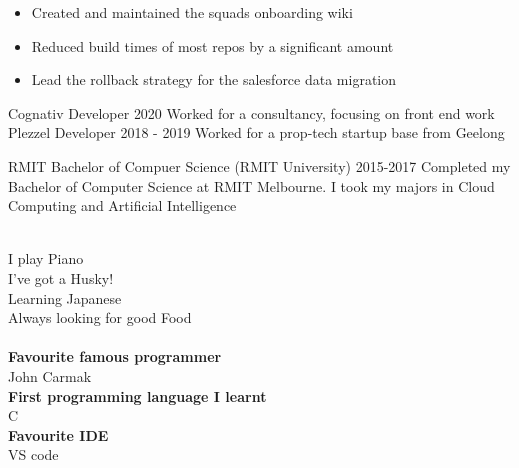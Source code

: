 \documentclass[8pt]{developercv}
\newcommand{\CC}{C\nolinebreak\hspace{-.05em}\raisebox{.4ex}{\tiny\bf +}\nolinebreak\hspace{-.10em}\raisebox{.4ex}{\tiny\bf +}}
\def\CC{{C\nolinebreak[4]\hspace{-.05em}\raisebox{.4ex}{\tiny\bf ++}}}
\begin{document}
\begin{minipage}[t]{0.7\textwidth}
\begin{entrylist}
{\begin{itemize}
					\item Created and maintained the squads onboarding wiki
					\item Reduced  build times of most repos by a significant amount
					\item Lead the rollback strategy for the salesforce data migration
				\end{itemize}								
				}
			\entry
				{Cognativ}
				{Developer}
				{2020}
				{Worked for a consultancy, focusing on front end work}
			\entry
				{Plezzel}
				{Developer}
				{2018 - 2019}
				{Worked for a prop-tech startup base from Geelong}
		\end{entrylist}			
		\begin{entrylist}	%
			\entry
				{RMIT}
				{Bachelor of Compuer Science (RMIT University)}
				{2015-2017}
				{Completed my Bachelor of Computer Science at RMIT Melbourne. I took my majors in Cloud Computing and Artificial Intelligence }
		\end{entrylist}
	\end{minipage}
\begin{minipage}[t]{0.05\textwidth}
\hphantom{0.1}
\end{minipage}
	\begin{minipage}[t]{0.3\textwidth}		%
		
		\\
		{I play Piano}\\
		{I've got a Husky!}\\
		{Learning Japanese}\\
		{Always looking for good Food}\\
		
		\\
		{\textbf{Favourite famous programmer}}\\
		{John Carmak}\\
		{\textbf{First programming language I learnt}}\\
		{\CC}\\
		{\textbf{Favourite IDE}}\\
		{VS code}\\

	\end{minipage}
\end{document}

